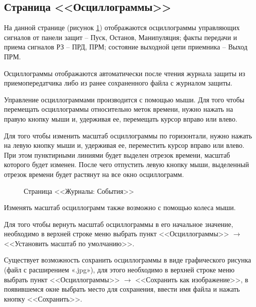 \subsection{Страница <<Осциллограммы>>}	\label{ssec:configurator_oscillogram}

На данной странице (рисунок \ref{fig:configurator_oscillogram}) отображаются осциллограммы управляющих сигналов от панели защит – Пуск, Останов, Манипуляция; факты передачи и приема сигналов РЗ – ПРД, ПРМ; состояние выходной цепи приемника – Выход ПРМ.

Осциллограммы отображаются автоматически после чтения журнала защиты из приемопередатчика либо из ранее сохраненного файла с журналом защиты.

Управление осциллограммами производится с помощью мыши. Для того чтобы перемещать осциллограммы относительно меток времени, нужно нажать на правую кнопку
мыши и, удерживая ее, перемещать курсор вправо или влево.

Для того чтобы изменить масштаб осциллограммы по горизонтали, нужно нажать на левую кнопку мыши и, удерживая ее, переместить курсор вправо или влево. При этом
пунктирными линиями будет выделен отрезок времени, масштаб которого будет изменен. После чего отпустить левую кнопку мыши, выделенный отрезок времени будет растянут на все окно осциллограмм.

\begin{figure}[H]
	
	\caption{Страница <<Журналы: События>>}
	\label{fig:configurator_oscillogram}
\end{figure}

Изменять масштаб осциллограмм также возможно с помощью колеса мыши.

Для того чтобы вернуть масштаб осциллограммы в его начальное значение, необходимо в верхней строке меню выбрать пункт <<Осциллограммы>> $\rightarrow$ <<Установить масштаб по умолчанию>>.

Существует возможность сохранить осциллограммы в виде графического рисунка (файл с расширением «.jpg»), для этого необходимо в верхней строке меню выбрать пункт <<Осциллограммы>> $\rightarrow$ <<Сохранить как изображение>>, в появившемся окне выбрать место для сохранения, ввести имя файла и нажать кнопку <<Сохранить>>.
